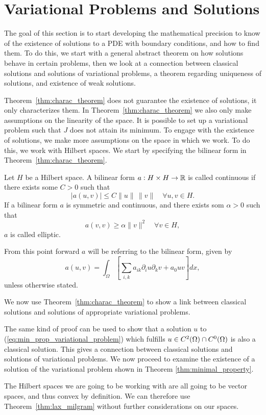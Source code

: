 \section{Variational Problems and Solutions}
The goal of this section is to start developing the mathematical 
precision to know of the existence of solutions to a PDE with boundary conditions, and how to find 
them. 
To do this, we start with a general abstract theorem on how solutions 
behave in certain problems, then we look at a connection between 
classical solutions and solutions of variational problems, a 
theorem regarding uniqueness of solutions, and existence of 
weak solutions.


Theorem~\ref{thm:charac_theorem} does not guarantee the existence 
of solutions, it only characterizes them. In Theorem~\ref{thm:charac_theorem} we 
also only make assumptions on the linearity of the space. 
It is possible to set up a variational problem such that $J$ does 
not attain its minimum.
To engage with the existence of solutions, we make more assumptions on 
the space in which we work. To do this, we work with Hilbert spaces. 
We start by specifying the bilinear form in Theorem~\ref{thm:charac_theorem}.
\begin{defn}{\quad}
   Let $H$ be a Hilbert space. A bilinear form $a : H \times H \to \mathbb{R}$ is 
   called continuous if there exists some $C > 0$ such that 
   \begin{equation}
    |a(u,v)| \leq C \|u\|\, \|v\| \quad \forall u,v \in H.
   \end{equation} 
   If a bilinear form $a$ is symmetric and continuous, and there exists som $\alpha >0$ such that 
   \begin{equation*}
    a(v,v) \geq \alpha \|v\|^2 \quad \forall v \in H,
   \end{equation*}
   $a$ is called elliptic.\label{def:elliptic}
 \end{defn}
From this point forward $a$ will be referring to the bilinear form, given by
\begin{equation}
   a(u,v) = \int_\Omega \left[\sum_{i,k} a_{ik}\partial_i u\partial_k v+a_0uv\right]dx,
\end{equation}
unless otherwise stated.

We now use Theorem~\ref{thm:charac_theorem} to show a link between classical 
solutions and solutions of appropriate variational problems.

The same kind of proof can be used to show that a solution $u$ to 
(\ref{eq:min_prop_variational_problem}) which fulfills 
$u\in C^2(\Omega) \cap C^0(\Omega)$ is also a classical solution. 
This gives a connection between classical solutions and solutions of 
variational problems. We now proceed to examine the existence of a 
solution of the variational problem shown in Theorem \ref*{thm:minimal_property}.

The Hilbert spaces we are going to be working with are all going to be 
vector spaces, and thus convex by definition. 
We can therefore use Theorem~\ref{thm:lax_milgram} without further considerations 
on our spaces.



